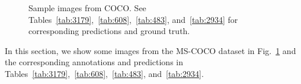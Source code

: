 \documentclass[12pt,journal,compsoc]{IEEEtran}
\begin{document}


\begin{figure}%
\caption{Sample images from COCO. See Tables~\ref{tab:3179},~\ref{tab:608},~\ref{tab:483}, and~\ref{tab:2934} for corresponding predictions and ground truth.}
\label{fig:coco_valid}
\vspace*{4pt}
\end{figure}

In this section, we show some images from the MS-COCO dataset in Fig.~\ref{fig:coco_valid} and the corresponding annotations and predictions in Tables~\ref{tab:3179},~\ref{tab:608},~\ref{tab:483}, and~\ref{tab:2934}.
\end{document}
